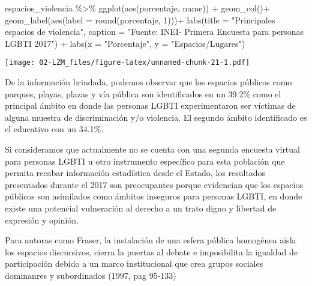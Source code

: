 \documentclass[
]{book}
\newenvironment{Shaded}{\begin{snugshade}}{\end{snugshade}}
\newcommand{\AttributeTok}[1]{\textcolor[rgb]{0.77,0.63,0.00}{#1}}
\newcommand{\DecValTok}[1]{\textcolor[rgb]{0.00,0.00,0.81}{#1}}
\newcommand{\FunctionTok}[1]{\textcolor[rgb]{0.00,0.00,0.00}{#1}}
\newcommand{\NormalTok}[1]{#1}
\newcommand{\SpecialCharTok}[1]{\textcolor[rgb]{0.00,0.00,0.00}{#1}}
\newcommand{\StringTok}[1]{\textcolor[rgb]{0.31,0.60,0.02}{#1}}
\theoremstyle{definition}
\theoremstyle{definition}
\theoremstyle{definition}
\theoremstyle{definition}
\theoremstyle{remark}
\begin{document}
\begin{Shaded}
\begin{Highlighting}[]
\NormalTok{espacios\_violencia }\SpecialCharTok{\%\textgreater{}\%} 
  \FunctionTok{ggplot}\NormalTok{(}\FunctionTok{aes}\NormalTok{(porcentaje, name)) }\SpecialCharTok{+}
  \FunctionTok{geom\_col}\NormalTok{()}\SpecialCharTok{+}
  \FunctionTok{geom\_label}\NormalTok{(}\FunctionTok{aes}\NormalTok{(}\AttributeTok{label =} \FunctionTok{round}\NormalTok{(porcentaje, }\DecValTok{1}\NormalTok{)))}\SpecialCharTok{+}
    \FunctionTok{labs}\NormalTok{(}\AttributeTok{title =} \StringTok{"Principales espacios de violencia"}\NormalTok{, }
       \AttributeTok{caption =} \StringTok{"Fuente: INEI{-} Primera Encuesta para personas LGBTI 2017"}\NormalTok{) }\SpecialCharTok{+}
  \FunctionTok{labs}\NormalTok{(}\AttributeTok{x =} \StringTok{"Porcentaje"}\NormalTok{,}
       \AttributeTok{y =} \StringTok{"Espacios/Lugares"}\NormalTok{)}
\end{Highlighting}
\end{Shaded}

\texttt{[image: 02-LZM\_files/figure-latex/unnamed-chunk-21-1.pdf]}

De la información brindada, podemos observar que los espacios públicos como parques, playas, plazas y vía pública son identificados en un 39.2\% como el principal ámbito en donde las personas LGBTI experimentaron ser víctimas de alguna muestra de discriminación y/o violencia. El segundo ámbito identificado es el educativo con un 34.1\%.

Si consideramos que actualmente no se cuenta con una segunda encuesta virtual para personas LGBTI u otro instrumento específico para esta población que permita recabar información estadística desde el Estado, los resultados presentados durante el 2017 son preocupantes porque evidencian que los espacios públicos son asimilados como ámbitos inseguros para personas LGBTI, en donde existe una potencial vulneración al derecho a un trato digno y libertad de expresión y opinión.

Para autoras como Fraser, la instalación de una esfera pública homogénea aisla los espacios discursivos, cierra la puertas al debate e imposibilita la igualdad de participación debido a un marco institucional que crea grupos sociales dominanres y subordinados (1997, pag 95-133)
\end{document}
